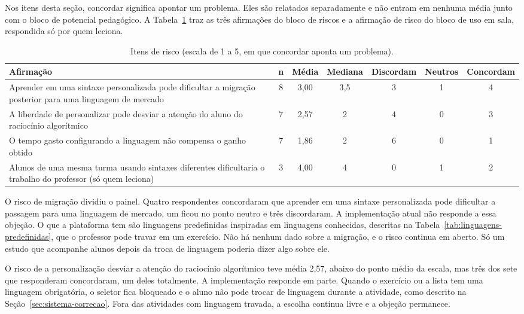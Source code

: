 Nos itens desta seção, concordar significa apontar um problema. Eles são relatados separadamente e não entram em nenhuma média junto com o bloco de potencial pedagógico. A Tabela~\ref{tab:resultado-riscos} traz as três afirmações do bloco de riscos e a afirmação de risco do bloco de uso em sala, respondida só por quem leciona.

\begin{table}[htbp]
\centering
\caption{Itens de risco (escala de 1 a 5, em que concordar aponta um problema).}
\label{tab:resultado-riscos}
\footnotesize
\renewcommand{\arraystretch}{1.2}
\begin{tabular}{|p{5.8cm}|c|c|c|c|c|c|}
\hline
\textbf{Afirmação} & \textbf{n} & \textbf{Média} & \textbf{Mediana} & \textbf{Discordam} & \textbf{Neutros} & \textbf{Concordam} \\\hline
Aprender em uma sintaxe personalizada pode dificultar a migração posterior para uma linguagem de mercado & 8 & 3,00 & 3,5 & 3 & 1 & 4 \\\hline
A liberdade de personalizar pode desviar a atenção do aluno do raciocínio algorítmico & 7 & 2,57 & 2 & 4 & 0 & 3 \\\hline
O tempo gasto configurando a linguagem não compensa o ganho obtido & 7 & 1,86 & 2 & 6 & 0 & 1 \\\hline
Alunos de uma mesma turma usando sintaxes diferentes dificultaria o trabalho do professor (só quem leciona) & 3 & 4,00 & 4 & 0 & 1 & 2 \\\hline
\end{tabular}
\end{table}

O risco de migração dividiu o painel. Quatro respondentes concordaram que aprender em uma sintaxe personalizada pode dificultar a passagem para uma linguagem de mercado, um ficou no ponto neutro e três discordaram. A implementação atual não responde a essa objeção. O que a plataforma tem são linguagens predefinidas inspiradas em linguagens conhecidas, descritas na Tabela~\ref{tab:linguagens-predefinidas}, que o professor pode travar em um exercício. Não há nenhum dado sobre a migração, e o risco continua em aberto. Só um estudo que acompanhe alunos depois da troca de linguagem poderia dizer algo sobre ele.

O risco de a personalização desviar a atenção do raciocínio algorítmico teve média 2,57, abaixo do ponto médio da escala, mas três dos sete que responderam concordaram, um deles totalmente. A implementação responde em parte. Quando o exercício ou a lista tem uma linguagem obrigatória, o seletor fica bloqueado e o aluno não pode trocar de linguagem durante a atividade, como descrito na Seção~\ref{sec:sistema-correcao}. Fora das atividades com linguagem travada, a escolha continua livre e a objeção permanece.

